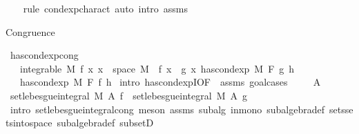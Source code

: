 \begin{isabellebody}
%
\isadelimproof
\ \ %
\endisadelimproof
%
\isatagproof
{}\isamarkupfalse%
\ {\isacharparenleft}{\kern0pt}rule\ cond{\isacharunderscore}{\kern0pt}exp{\isacharunderscore}{\kern0pt}charact{\isacharcomma}{\kern0pt}\ auto\ intro{\isacharcolon}{\kern0pt}\ assms{\isacharparenright}{\kern0pt}%
\endisatagproof
{\isafoldproof}%
%
\isadelimproof
%
\endisadelimproof
%
\begin{isamarkuptext}%
Congruence%
\end{isamarkuptext}\isamarkuptrue%
\isamarkupfalse%
\ has{\isacharunderscore}{\kern0pt}cond{\isacharunderscore}{\kern0pt}exp{\isacharunderscore}{\kern0pt}cong{\isacharcolon}{\kern0pt}\isanewline
\ \ \ {\isachardoublequoteopen}integrable\ M\ f{\isachardoublequoteclose}\ {\isachardoublequoteopen}{\isasymAnd}x{\isachardot}{\kern0pt}\ x\ {\isasymin}\ space\ M\ {\isasymLongrightarrow}\ f\ x\ {\isacharequal}{\kern0pt}\ g\ x{\isachardoublequoteclose}\ {\isachardoublequoteopen}has{\isacharunderscore}{\kern0pt}cond{\isacharunderscore}{\kern0pt}exp\ M\ F\ g\ h{\isachardoublequoteclose}\isanewline
\ \ \ {\isachardoublequoteopen}has{\isacharunderscore}{\kern0pt}cond{\isacharunderscore}{\kern0pt}exp\ M\ F\ f\ h{\isachardoublequoteclose}\isanewline
%
\isadelimproof
%
\endisadelimproof
%
\isatagproof
{}\isamarkupfalse%
\ {\isacharparenleft}{\kern0pt}intro\ has{\isacharunderscore}{\kern0pt}cond{\isacharunderscore}{\kern0pt}expI{\isacharprime}{\kern0pt}{\isacharbrackleft}{\kern0pt}OF\ {\isacharunderscore}{\kern0pt}\ assms{\isacharparenleft}{\kern0pt}{}{\isacharparenright}{\kern0pt}{\isacharbrackright}{\kern0pt}{\isacharcomma}{\kern0pt}\ goal{\isacharunderscore}{\kern0pt}cases{\isacharparenright}{\kern0pt}\isanewline
\ \ \isamarkupfalse%
\ {\isacharparenleft}{\kern0pt}{}\ A{\isacharparenright}{\kern0pt}\isanewline
\ \ \isamarkupfalse%
\ {\isachardoublequoteopen}set{\isacharunderscore}{\kern0pt}lebesgue{\isacharunderscore}{\kern0pt}integral\ M\ A\ f\ {\isacharequal}{\kern0pt}\ set{\isacharunderscore}{\kern0pt}lebesgue{\isacharunderscore}{\kern0pt}integral\ M\ A\ g{\isachardoublequoteclose}\ \isamarkupfalse%
\ {\isacharparenleft}{\kern0pt}intro\ set{\isacharunderscore}{\kern0pt}lebesgue{\isacharunderscore}{\kern0pt}integral{\isacharunderscore}{\kern0pt}cong{\isacharparenright}{\kern0pt}\ {\isacharparenleft}{\kern0pt}meson\ assms{\isacharparenleft}{\kern0pt}{}{\isacharparenright}{\kern0pt}\ subalg\ in{\isacharunderscore}{\kern0pt}mono\ subalgebra{\isacharunderscore}{\kern0pt}def\ sets{\isachardot}{\kern0pt}sets{\isacharunderscore}{\kern0pt}into{\isacharunderscore}{\kern0pt}space\ subalgebra{\isacharunderscore}{\kern0pt}def\ subsetD{\isacharparenright}{\kern0pt}{\isacharplus}{\kern0pt}\isanewline

\end{isabellebody}
